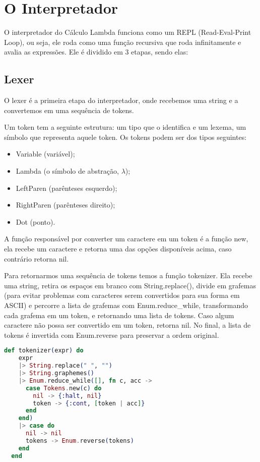 \documentclass[12pt]{article}
\begin{document}
\section{O Interpretador}

O interpretador do Cálculo Lambda funciona como um REPL (Read-Eval-Print Loop), ou seja, ele roda como uma função recursiva que roda infinitamente e avalia as expressões. Ele é dividido em 3 etapas, sendo elas:

\subsection{Lexer}

O lexer é a primeira etapa do interpretador, onde recebemos uma string e a convertemos em uma sequência de tokens.

Um token tem a seguinte estrutura: um tipo que o identifica e um lexema, um símbolo que representa aquele token. Os tokens podem ser dos tipos seguintes:
\begin{itemize}
	\item Variable (variável);
	\item Lambda (o símbolo de abstração, $\lambda$);
	\item LeftParen (parênteses esquerdo);
	\item RightParen (parênteses direito);
	\item Dot (ponto).
\end{itemize}

A função responsável por converter um caractere em um token é a função new, ela recebe um caractere e retorna uma das opções disponíveis acima, caso contrário retorna nil.

Para retornarmos uma sequência de tokens temos a função tokenizer. Ela recebe uma string, retira os espaços em branco com String.replace(), divide em grafemas (para evitar problemas com caracteres serem convertidos para sua forma em ASCII) e percorre a lista de grafemas com Enum.reduce\_while, transformando cada grafema em um token, e retornando uma lista de tokens. Caso algum caractere não possa ser convertido em um token, retorna nil. No final, a lista de tokens é invertida com Enum.reverse para preservar a ordem original.

\begin{lstlisting}[language=elixir, caption=Função \texttt{tokenizer}]
   def tokenizer(expr) do
    expr
    |> String.replace(" ", "")
    |> String.graphemes()
    |> Enum.reduce_while([], fn c, acc ->
      case Tokens.new(c) do
        nil -> {:halt, nil}
        token -> {:cont, [token | acc]}
      end
    end)
    |> case do
      nil -> nil
      tokens -> Enum.reverse(tokens)
    end
  end
\end{lstlisting}
\end{document}
